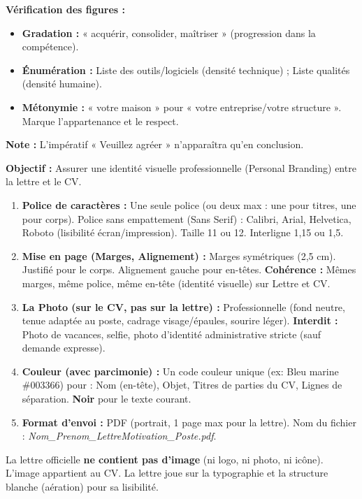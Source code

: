 \documentclass[11pt]{article}
\newcommand{\cle}[1]{{\popxbold\color{popdark}#1}}
\begin{document}
\begin{exoresolu}
    \textbf{Vérification des figures :}
    \begin{itemize}
        \item \textbf{Gradation :} « acquérir, consolider, maîtriser » (progression dans la compétence).
        \item \textbf{Énumération :} Liste des outils/logiciels (densité technique) ; Liste qualités (densité humaine).
        \item \textbf{Métonymie :} « votre maison » pour « votre entreprise/votre structure ». Marque l'appartenance et le respect.
    \end{itemize}
    \textbf{Note :} L'impératif « Veuillez agréer » n'apparaîtra qu'en conclusion.
\end{exoresolu}

\begin{methode}
    \textbf{Objectif :} Assurer une identité visuelle professionnelle (Personal Branding) entre la lettre et le CV.
    \begin{enumerate}
        \item \textbf{Police de caractères :} Une seule police (ou deux max : une pour titres, une pour corps). \cle{Police sans empattement (Sans Serif)} : Calibri, Arial, Helvetica, Roboto (lisibilité écran/impression). Taille 11 ou 12. Interligne 1,15 ou 1,5.
        \item \textbf{Mise en page (Marges, Alignement) :} Marges symétriques (2,5 cm). Justifié pour le corps. Alignement gauche pour en-têtes. \textbf{Cohérence :} Mêmes marges, même police, même en-tête (identité visuelle) sur Lettre et CV.
        \item \textbf{La Photo (sur le CV, pas sur la lettre) :} Professionnelle (fond neutre, tenue adaptée au poste, cadrage visage/épaules, sourire léger). \textbf{Interdit :} Photo de vacances, selfie, photo d'identité administrative stricte (sauf demande expresse).
        \item \textbf{Couleur (avec parcimonie) :} Un code couleur unique (ex: Bleu marine \#003366) pour : Nom (en-tête), Objet, Titres de parties du CV, Lignes de séparation. \textbf{Noir} pour le texte courant.
        \item \textbf{Format d'envoi :} \cle{PDF} (portrait, 1 page max pour la lettre). Nom du fichier : \textit{Nom\_Prenom\_LettreMotivation\_Poste.pdf}.
    \end{enumerate}
    \begin{attention}
        La lettre officielle \textbf{ne contient pas d'image} (ni logo, ni photo, ni icône). L'image appartient au CV. La lettre joue sur la \cle{typographie} et la \cle{structure blanche} (aération) pour sa lisibilité.
    \end{attention}
\end{methode}
\end{document}
